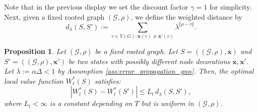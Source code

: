 \documentclass{article}
\newtheorem{proposition}{Proposition}
\begin{document}
Note that in the previous display we set the discount factor $\gamma=1$ for simplicity. Next, given a fixed rooted graph $(\mathcal G, \rho)$, we define the weighted distance by
\[
d_{\lambda}(S, S') := \sum_{v \in V(G): \mathbf{x}(v) \neq \mathbf{x}'(v)} \lambda^{\Vert \rho - v \Vert}.
\]
\begin{proposition}
\label{prop:value_stability}
Let $(\mathcal G, \rho)$ be a fixed rooted graph. Let $S = ((\mathcal G, \rho), \mathbf{x})$ and $S' = ((\mathcal G, \rho), \mathbf{x}')$ be two states with possibly different node decorations $\mathbf{x}, \mathbf{x}'$.
Let $\lambda := \alpha \Delta < 1$ by Assumption \ref{ass:error_propagation_gnn}. 
Then, the optimal local value function $W_t^*(S)$ satisfies:
\[
|W_t^*(S) - W_t^*(S')| \le L_t \, d_{\lambda}(S, S'),
\]
where $L_t < \infty$ is a constant depending on $T$ but is uniform in $(\mathcal G, \rho)$.
\end{proposition}
\end{document}
